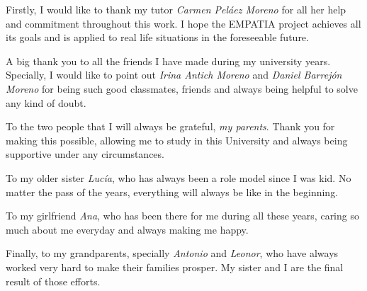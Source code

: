 
	Firstly, I would like to thank my tutor \textit{Carmen Peláez Moreno} for all her help and commitment throughout this work. I hope the EMPATIA project achieves all its goals and is applied to real life situations in the foreseeable future.
	
	A big thank you to all the friends I have made during my university years. Specially, I would like to point out \textit{Irina Antich Moreno} and \textit{Daniel Barrejón Moreno} for being such good classmates, friends and always being helpful to solve any kind of doubt.
	
	To the two people that I will always be grateful, \textit{my parents}. Thank you for making this possible, allowing me to study in this University and always being supportive under any circumstances.
	
	To my older sister \textit{Lucía}, who has always been a role model since I was kid. No matter the pass of the years, everything will always be like in the beginning.
	
	To my girlfriend \textit{Ana}, who has been there for me during all these years, caring so much about me everyday and always making me happy.
	
	Finally, to my grandparents, specially \textit{Antonio} and \textit{Leonor}, who have always worked very hard to make their families prosper. My sister and I are the final result of those efforts.
	
	
	
	